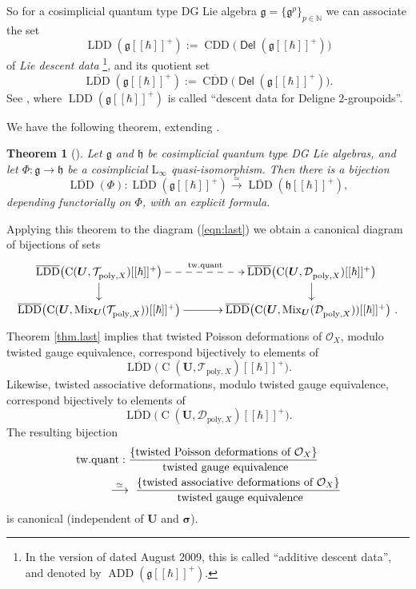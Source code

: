 \documentclass{conm-p-l}
\newtheorem{thm}[equation]{Theorem}
\theoremstyle{definition}
\numberwithin{equation}{section}
\newcommand{\ol}{\overline}
\newcommand{\iso}{\stackrel{\simeq}{\longrightarrow}}
\newcommand{\opn}{\operatorname}
\newcommand{\cat}[1]{\operatorname{\mathsf{#1}}}
\newcommand{\mfrak}[1]{\mathfrak{#1}}
\newcommand{\mcal}[1]{\mathcal{#1}}
\newcommand{\mrm}[1]{\mathrm{#1}}
\newcommand{\mbb}[1]{\mathbb{#1}}
\newcommand{\tup}[1]{\textup{#1}}
\newcommand{\bsym}[1]{\boldsymbol{#1}}
\newcommand{\g}{\mfrak{g}}
\newcommand{\h}{\mfrak{h}}
\begin{document}
So for a cosimplicial quantum type DG Lie algebra 
$\g = \{ \g^p \}_{p \in \mbb{N}}$ we can associate the set
\[ \opn{LDD}(\g[[\hbar]]^+) := \opn{CDD} \bigl( \bsym{\cat{Del}}(\g[[\hbar]]^+)
\bigr) \]
of {\em Lie descent data}
\footnote{In the version of \cite{Ye5} dated August 2009, 
this is called ``additive descent data'', and denoted by 
$\opn{ADD}(\g[[\hbar]]^+)$.}, 
and its quotient set 
\[ \ol{\opn{LDD}}(\g[[\hbar]]^+) := \ol{\opn{CDD}} 
\bigl( \bsym{\cat{Del}}(\g[[\hbar]]^+) \bigr) . \]
See \cite[Section 3.2]{BGNT}, where $\opn{LDD}(\g[[\hbar]]^+)$
is called ``descent data for Deligne $2$-groupoids''.  

We have the following theorem, extending \cite[Proposition 3.3.1]{BGNT}.

\begin{thm}[\cite{Ye5}]
Let $\g$ and $\h$ be cosimplicial quantum type DG Lie algebras, and let 
$\Phi : \g \to \h$ be a cosimplicial $\mrm{L}_{\infty}$ quasi-isomorphism.
Then there is a bijection 
\[ \ol{\opn{LDD}}(\Phi) : \ol{\opn{LDD}}(\g[[\hbar]]^+) \iso
\ol{\opn{LDD}}(\h[[\hbar]]^+) , \]
depending functorially on $\Phi$, with an explicit formula.
\end{thm}

Applying this theorem to the diagram (\ref{eqn:last}) we obtain a canonical
diagram of bijections of sets
\[ \UseTips \xymatrix @C=8ex @R=3.5ex {
\ol{\opn{LDD}} \bigl( 
\opn{C}(\bsym{U}, \mcal{T}^{}_{\mrm{poly}, X})[[\hbar]]^+ \bigr)
\ar[d]
\ar@{-->}[r]^{\opn{tw{.}quant}}
& 
\ol{\opn{LDD}} \bigl( 
\opn{C}(\bsym{U}, \mcal{D}^{}_{\mrm{poly}, X})[[\hbar]]^+ \bigr)
\ar[d] 
\\
\ol{\opn{LDD}} \bigl( 
\opn{C}(\bsym{U},
\opn{Mix}_{\bsym{U}}(\mcal{T}^{}_{\mrm{poly}, X} ))
[[\hbar]]^+ \bigr)
\ar[r]
&
\ol{\opn{LDD}} \bigl( 
\opn{C}(\bsym{U}, \opn{Mix}_{\bsym{U}}(\mcal{D}^{}_{\mrm{poly}, X} ))
[[\hbar]]^+ \bigr) \ .
} \] 
Theorem \ref{thm.last} implies that twisted Poisson deformations of
$\mcal{O}_X$, modulo twisted gauge equivalence, correspond bijectively
to elements of  
\[ \ol{\opn{LDD}} \bigl( \opn{C}(\bsym{U}, \mcal{T}^{}_{\mrm{poly}, X})
[[\hbar]]^+ \bigr) . \]
Likewise, twisted associative deformations,
modulo twisted gauge equivalence, correspond bijectively to elements of
\[ \ol{\opn{LDD}} \bigl( \opn{C}(\bsym{U}, \mcal{D}^{}_{\mrm{poly}, X})
[[\hbar]]^+ \bigr) . \]
The resulting bijection
\[ \begin{aligned}
& \opn{tw{.}quant} : \frac{ \{ \tup{twisted Poisson deformations of 
$\mcal{O}_{X}$} \} }
{\tup{ twisted gauge equivalence}} \\
&  \hspace{3em} \iso \ 
\frac{ \{ \tup{twisted associative deformations of 
$\mcal{O}_X$} \} }{\tup{ twisted gauge equivalence}} 
\end{aligned} \] 
is canonical (independent of $\bsym{U}$ and $\bsym{\sigma}$). 
\end{document}
